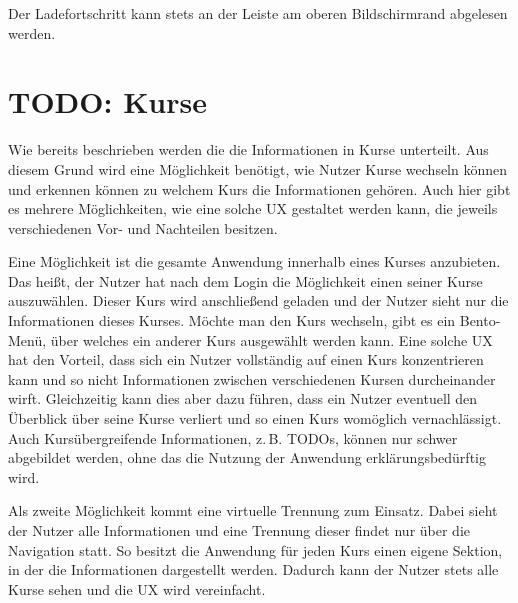 










Der Ladefortschritt kann stets an der Leiste am oberen Bildschirmrand abgelesen werden.

\section{TODO: Kurse}
Wie bereits beschrieben werden die die Informationen in Kurse unterteilt.
Aus diesem Grund wird eine Möglichkeit benötigt, wie Nutzer Kurse wechseln können und erkennen können zu welchem Kurs die Informationen gehören.
Auch hier gibt es mehrere Möglichkeiten, wie eine solche \ac{UX} gestaltet werden kann, die jeweils verschiedenen Vor- und Nachteilen besitzen.

Eine Möglichkeit ist die gesamte Anwendung innerhalb eines Kurses anzubieten.
Das heißt, der Nutzer hat nach dem Login die Möglichkeit einen seiner Kurse auszuwählen.
Dieser Kurs wird anschließend geladen und der Nutzer sieht nur die Informationen dieses Kurses.
Möchte man den Kurs wechseln, gibt es ein Bento-Menü, über welches ein anderer Kurs ausgewählt werden kann.
Eine solche \ac{UX} hat den Vorteil, dass sich ein Nutzer vollständig auf einen Kurs konzentrieren kann und so nicht Informationen zwischen verschiedenen Kursen durcheinander wirft.
Gleichzeitig kann dies aber dazu führen, dass ein Nutzer eventuell den Überblick über seine Kurse verliert und so einen Kurs womöglich vernachlässigt.
Auch Kursübergreifende Informationen, z.\,B. TODOs, können nur schwer abgebildet werden, ohne das die Nutzung der Anwendung erklärungsbedürftig wird.

Als zweite Möglichkeit kommt eine virtuelle Trennung zum Einsatz.
Dabei sieht der Nutzer alle Informationen und eine Trennung dieser findet nur über die Navigation statt.
So besitzt die Anwendung für jeden Kurs einen eigene Sektion, in der die Informationen dargestellt werden.
Dadurch kann der Nutzer stets alle Kurse sehen und die \ac{UX} wird vereinfacht.





